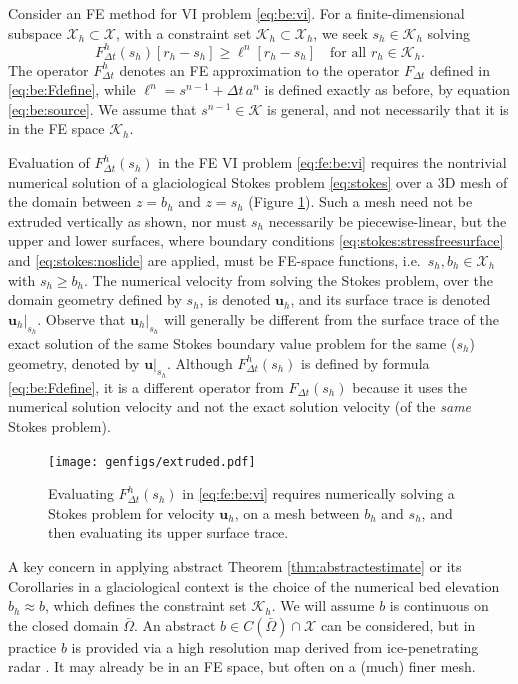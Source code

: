 \documentclass[hidelinks,onefignum,onetabnum,final]{siamart220329}  %
\newcommand{\bu}{\mathbf{u}}
\newcommand{\cK}{\mathcal{K}}
\newcommand{\cX}{\mathcal{X}}
\begin{document}
Consider an FE method for VI problem \eqref{eq:be:vi}.  For a finite-dimensional subspace $\cX_h\subset \cX$, with a constraint set $\cK_h\subset \cX_h$, we seek $s_h\in\cK_h$ solving
\begin{equation}
F^h_{\Delta t}(s_h)[r_h-s_h] \ge \ell^n[r_h-s_h] \quad \text{for all } r_h \in \cK_h. \label{eq:fe:be:vi}
\end{equation}
The operator $F^h_{\Delta t}$ denotes an FE approximation to the operator $F_{\Delta t}$ defined in \eqref{eq:be:Fdefine}, while $\ell^n = s^{n-1} + \Delta t\,a^n$ is defined exactly as before, by equation \eqref{eq:be:source}.  We assume that $s^{n-1} \in \cK$ is general, and not necessarily that it is in the FE space $\cK_h$.

Evaluation of $F^h_{\Delta t}(s_h)$ in the FE VI problem \eqref{eq:fe:be:vi} requires the nontrivial numerical solution of a glaciological Stokes problem \eqref{eq:stokes} over a 3D mesh of the domain between $z=b_h$ and $z=s_h$ (Figure \ref{fig:fe:operatorvisualization}).  Such a mesh need not be extruded vertically as shown, nor must $s_h$ necessarily be piecewise-linear, but the upper and lower surfaces, where boundary conditions \eqref{eq:stokes:stressfreesurface} and \eqref{eq:stokes:noslide} are applied, must be FE-space functions, i.e.~$s_h,b_h\in\cX_h$ with $s_h\ge b_h$.  The numerical velocity from solving the Stokes problem, over the domain geometry defined by $s_h$, is denoted $\bu_h$, and its surface trace is denoted $\bu_h|_{s_h}$.  Observe that $\bu_h|_{s_h}$ will generally be different from the surface trace of the exact solution of the same Stokes boundary value problem for the same ($s_h$) geometry, denoted by $\bu|_{s_h}$.  Although $F^h_{\Delta t}(s_h)$ is defined by formula \eqref{eq:be:Fdefine}, it is a different operator from $F_{\Delta t}(s_h)$ because it uses the numerical solution velocity and not the exact solution velocity (of the \emph{same} Stokes problem).

\begin{figure}[ht]
\begin{center}
\texttt{[image: genfigs/extruded.pdf]}
\end{center}
\caption{Evaluating $F^h_{\Delta t}(s_h)$ in \eqref{eq:fe:be:vi} requires numerically solving a Stokes problem for velocity $\bu_h$, on a mesh between $b_h$ and $s_h$, and then evaluating its upper surface trace.}
\label{fig:fe:operatorvisualization}
\end{figure}

A key concern in applying abstract Theorem \ref{thm:abstractestimate} or its Corollaries in a glaciological context is the choice of the numerical bed elevation $b_h \approx b$, which defines the constraint set $\cK_h$.  We will assume $b$ is continuous on the closed domain $\bar\Omega$.  An abstract $b\in C(\bar\Omega) \cap \cX$ can be considered, but in practice $b$ is provided via a high resolution map derived from ice-penetrating radar \cite{Morlighemetal2017}.  It may already be in an FE space, but often on a (much) finer mesh.
\end{document}
